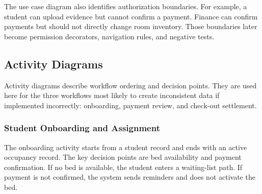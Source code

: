 \documentclass[11pt,a4paper]{article}
\begin{document}
The use case diagram also identifies authorization boundaries. For example, a student can upload evidence but cannot confirm a payment. Finance can confirm payments but should not directly change room inventory. Those boundaries later become permission decorators, navigation rules, and negative tests.

\subsection{Activity Diagrams}
Activity diagrams describe workflow ordering and decision points. They are used here for the three workflows most likely to create inconsistent data if implemented incorrectly: onboarding, payment review, and check-out settlement.

\subsubsection*{Student Onboarding and Assignment}
The onboarding activity starts from a student record and ends with an active occupancy record. The key decision points are bed availability and payment confirmation. If no bed is available, the student enters a waiting-list path. If payment is not confirmed, the system sends reminders and does not activate the bed.
\end{document}

